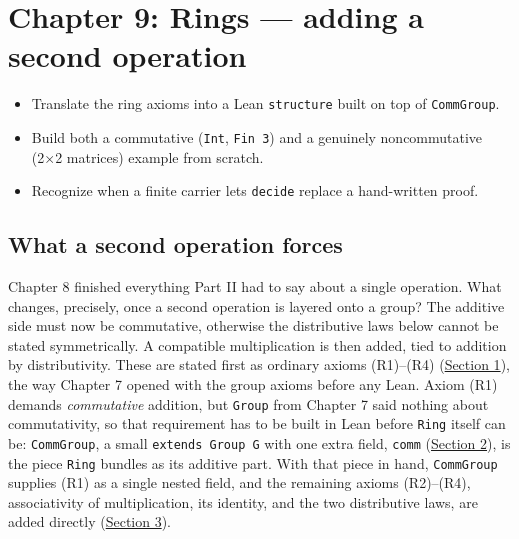 \chapter{Chapter 9: Rings --- adding a second operation}\label{sec:09-rings:00-index:1}

\begin{learningobjectives}
\begin{itemize}
\tightlist
\item
  Translate the ring axioms into a Lean \texttt{structure} built on top of \texttt{CommGroup}.
\item
  Build both a commutative (\texttt{Int}, \texttt{Fin 3}) and a genuinely noncommutative (2×2 matrices) example from scratch.
\item
  Recognize when a finite carrier lets \texttt{decide} replace a hand-written proof.
\end{itemize}
\end{learningobjectives}


\section{What a second operation forces}\label{sec:09-rings:00-index:2}

Chapter 8 finished everything Part II had to say about a single operation. What changes, precisely, once a second operation is layered onto a group? The additive side must now be commutative, otherwise the distributive laws below cannot be stated symmetrically. A compatible multiplication is then added, tied to addition by distributivity. These are stated first as ordinary axioms (R1)--(R4) (\hyperref[sec:09-rings:01-definition:1]{Section 1}), the way Chapter 7 opened with the group axioms before any Lean. Axiom (R1) demands \emph{commutative} addition, but \texttt{Group} from Chapter 7 said nothing about commutativity, so that requirement has to be built in Lean before \texttt{Ring} itself can be: \texttt{CommGroup}, a small \texttt{extends Group G} with one extra field, \texttt{comm} (\hyperref[sec:09-rings:02-comm-group:1]{Section 2}), is the piece \texttt{Ring} bundles as its additive part. With that piece in hand, \texttt{CommGroup} supplies (R1) as a single nested field, and the remaining axioms (R2)--(R4), associativity of multiplication, its identity, and the two distributive laws, are added directly (\hyperref[sec:09-rings:03-ring:1]{Section 3}).

